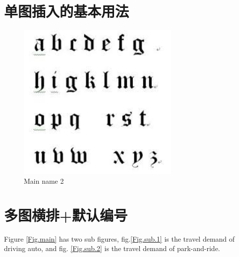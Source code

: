 \documentclass{article}
\begin{document}
\section{单图插入的基本用法}

\begin{figure}[H] %
\centering %
\includegraphics[width=0.7\textwidth]{figures/abc.jpeg} %
\caption{Main name 2} %
\label{Fig.main2} %
\end{figure}


\section{多图横排+默认编号}

Figure \ref{Fig.main} has two sub figures, 
fig.\ref{Fig.sub.1} is the travel demand of driving auto, 
and fig. \ref{Fig.sub.2} is the travel demand of park-and-ride.
\end{document}
